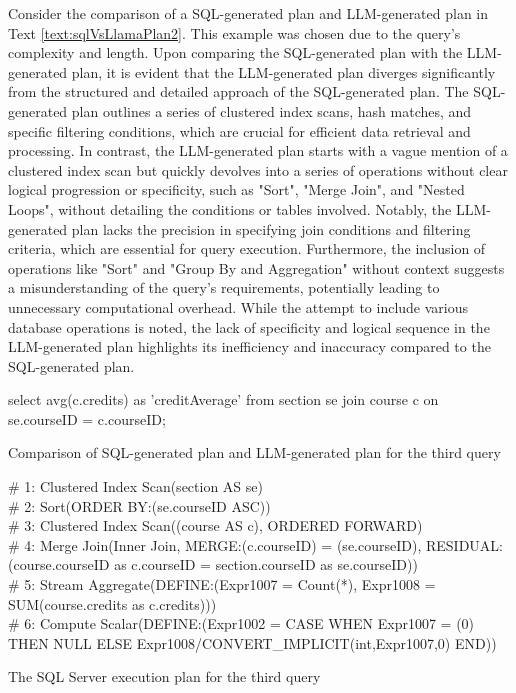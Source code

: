 Consider the comparison of a SQL-generated plan and LLM-generated plan in Text \ref{text:sqlVsLlamaPlan2}. This example was chosen due to the query's complexity and length. Upon comparing the SQL-generated plan with the LLM-generated plan, it is evident that the LLM-generated plan diverges significantly from the structured and detailed approach of the SQL-generated plan. The SQL-generated plan outlines a series of clustered index scans, hash matches, and specific filtering conditions, which are crucial for efficient data retrieval and processing. In contrast, the LLM-generated plan starts with a vague mention of a clustered index scan but quickly devolves into a series of operations without clear logical progression or specificity, such as "Sort", "Merge Join", and "Nested Loops", without detailing the conditions or tables involved. Notably, the LLM-generated plan lacks the precision in specifying join conditions and filtering criteria, which are essential for query execution. Furthermore, the inclusion of operations like "Sort" and "Group By and Aggregation" without context suggests a misunderstanding of the query's requirements, potentially leading to unnecessary computational overhead. While the attempt to include various database operations is noted, the lack of specificity and logical sequence in the LLM-generated plan highlights its inefficiency and inaccuracy compared to the SQL-generated plan.

\begin{text}
  \raggedright
  \ContinuedFloat*
  select avg(c.credits) as 'creditAverage' from section se join course c on se.courseID = c.courseID;
  \caption{Comparison of SQL-generated plan and LLM-generated plan for the third query}
  \label{text:sqlVsLlamaPlan3}
\end{text}

\begin{text}
  \raggedright
  \ContinuedFloat*
  \# 1: Clustered Index Scan(section AS se)\\
  \# 2: Sort(ORDER BY:(se.courseID ASC))\\
  \# 3: Clustered Index Scan((course AS c), ORDERED FORWARD)\\
  \# 4: Merge Join(Inner Join, MERGE:(c.courseID) = (se.courseID), RESIDUAL:(course.courseID as c.courseID = section.courseID as se.courseID))\\
  \# 5: Stream Aggregate(DEFINE:(Expr1007 = Count(*), Expr1008 = SUM(course.credits as c.credits)))\\
  \# 6: Compute Scalar(DEFINE:(Expr1002 = CASE WHEN Expr1007 = (0) THEN NULL ELSE Expr1008/CONVERT\_IMPLICIT(int,Expr1007,0) END))
  \caption{The SQL Server execution plan for the third query}
\end{text}


